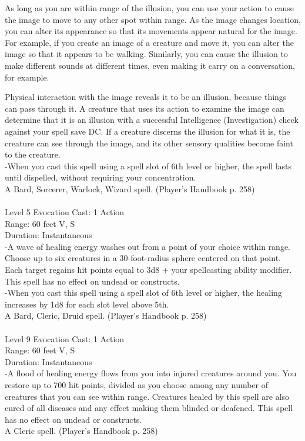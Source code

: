 \documentclass[10pt,twocolumn]{report}
\begin{document}
As long as you are within range of the illusion, you can use your action to cause the image to move to any other spot within range. As the image changes location, you can alter its appearance so that its movements appear natural for the image. For example, if you create an image of a creature and move it, you can alter the image so that it appears to be walking. Similarly, you can cause the illusion to make different sounds at different times, even making it carry on a conversation, for example.

Physical interaction with the image reveals it to be an illusion, because things can pass through it. A creature that uses its action to examine the image can determine that it is an illusion with a successful Intelligence (Investigation) check against your spell save DC. If a creature discerns the illusion for what it is, the creature can see through the image, and its other sensory qualities become faint to the creature.\\
-When you cast this spell using a spell slot of 6th level or higher, the spell lasts until dispelled, without requiring your concentration.\\
A Bard, Sorcerer, Warlock, Wizard spell. (Player's Handbook p. 258) \\


 \\
Level 5 \quad Evocation \quad Cast: 1 Action\\
Range: 60 feet \quad V, S\\
Duration: Instantaneous \quad \\
-A wave of healing energy washes out from a point of your choice within range.
Choose up to six creatures in a 30-foot-radius sphere centered on that point. Each target regains hit points equal to 3d8 + your spellcasting ability modifier. This spell has no effect on undead or constructs.\\
-When you cast this spell using a spell slot of 6th level or higher, the healing increases by 1d8 for each slot level above 5th.\\
A Bard, Cleric, Druid spell. (Player's Handbook p. 258) \\


 \\
Level 9 \quad Evocation \quad Cast: 1 Action\\
Range: 60 feet \quad V, S\\
Duration: Instantaneous \quad \\
-A flood of healing energy flows from you into injured creatures around you. You restore up to 700 hit points, divided as you choose among any number of creatures that you can see within range. Creatures healed by this spell are also cured of all diseases and any effect making them blinded or deafened. This spell has no effect on undead or constructs.\\
A Cleric spell. (Player's Handbook p. 258) \\
\end{document}
